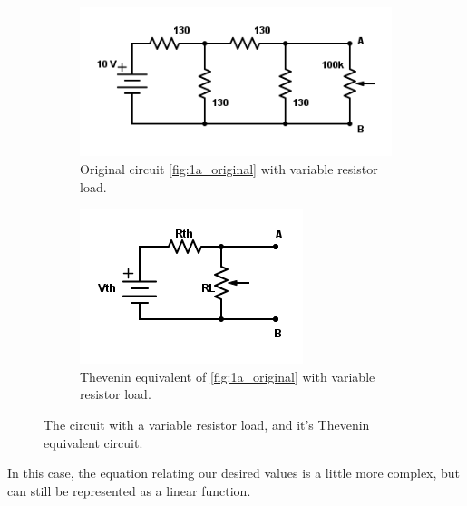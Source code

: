 \documentclass[11pt]{article}
\begin{document}
    \begin{figure}[H]
        \centering
        \begin{subfigure}{0.5\textwidth}
            \centering
            \includegraphics[width=\textwidth]{1d_originalLoad.png}
            \caption{Original circuit \ref{fig:1a_original} with variable resistor load.}
            \label{fig:1d_originalLoad}
        \end{subfigure}
        \begin{subfigure}{0.3\textwidth}
            \centering
            \includegraphics[width=\textwidth]{1d_theveninLoad.png}
            \caption{Thevenin equivalent of \ref{fig:1a_original} with variable resistor load.}
            \label{fig:1d_theveninLoad}
        \end{subfigure}
        \caption{The circuit with a variable resistor load, and it's Thevenin equivalent circuit.}
    \end{figure}

    In this case, the equation relating our desired values is a little more complex, but can still be represented as a linear function. \\
\end{document}
